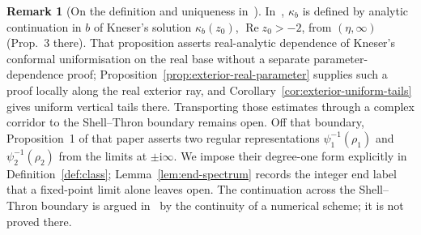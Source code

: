 \documentclass[11pt,a4paper]{article}
\theoremstyle{definition}
\newtheorem{remark}[theorem]{Remark}
\newcommand{\ii}{\mathrm{i}}
\begin{document}
\begin{remark}[On the definition and uniqueness in~\cite{Paulsen2019}]\label{rem:paulsen}
In~\cite{Paulsen2019}, $\kappa_b$ is defined by analytic continuation in $b$ of
Kneser's solution $\kappa_b(z_0)$, $\operatorname{Re}z_0>-2$, from $(\eta,\infty)$
(Prop.~3 there).  That proposition asserts real-analytic dependence of
Kneser's conformal uniformisation on the real base without a separate
parameter-dependence proof; Proposition~\ref{prop:exterior-real-parameter}
supplies such a proof locally along the real exterior ray, and
Corollary~\ref{cor:exterior-uniform-tails} gives uniform vertical tails
there.  Transporting those estimates through a complex corridor to the
Shell--Thron boundary remains open.  Off that boundary, Proposition~1 of
that paper asserts two
regular representations $\psi_1^{-1}(\rho_1)$ and
$\psi_2^{-1}(\rho_2)$ from the limits at $\pm\ii\infty$.
We impose their degree-one form explicitly in
Definition~\ref{def:class}; Lemma~\ref{lem:end-spectrum} records
the integer end label that a fixed-point limit alone leaves open.  The continuation across the Shell--Thron boundary is
argued in~\cite[\S5]{Paulsen2019} by the continuity of a numerical scheme; it is
not proved there.


\end{remark}
\end{document}

